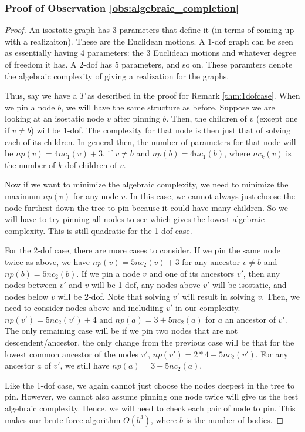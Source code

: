\subsubsection{Proof of Observation \ref{obs:algebraic_completion}}
\begin{proof}
    An isostatic graph has 3 parameters that define it (in terms of coming up with a realizaiton). These are the Euclidean motions. A 1-dof graph can be seen as essentially having 4 parameters: the 3 Euclidean motions and whatever degree of freedom it has. A 2-dof has 5 parameters, and so on. These paramters denote the algebraic complexity of giving a realization for the graphs.

    Thus, say we have a $T$ as described in the proof for Remark \ref{thm:1dofcase}. When we pin a node $b$, we will have the same structure as before. Suppose we are looking at an isostatic node $v$ after pinning $b$. Then, the children of $v$ (except one if $v \neq b$) will be 1-dof. The complexity for that node is then just that of solving each of its children. In general then, the number of parameters for that node will be $np(v) = 4nc_1(v)+3$, if $v \neq b$ and $np(b) = 4nc_1(b)$, where $nc_k(v)$ is the number of $k$-dof children of $v$.

    Now if we want to minimize the algebraic complexity, we need to minimize the maximum $np(v)$ for any node $v$. In this case, we cannot always just choose the node furthest down the tree to pin because it could have many children. So we will have to try pinning all nodes to see which gives the lowest algebraic complexity. This is still quadratic for the 1-dof case.

    For the 2-dof case, there are more cases to consider. If we pin the same node twice as above, we have $np(v) = 5nc_2(v)+3$ for any ancestor $v \neq b$ and $np(b) = 5nc_2(b)$. If we pin a node $v$ and one of its ancestors $v'$, then any nodes between $v'$ and $v$ will be 1-dof, any nodes above $v'$ will be isostatic, and nodes below $v$ will be 2-dof. Note that solving $v'$ will result in solving $v$. Then, we need to consider nodes above and includiing $v'$ in our complexity. $np(v') = 5nc_2(v') + 4$ and $np(a) = 3 + 5nc_2(a)$ for $a$ an ancestor of $v'$. The only remaining case will be if we pin two nodes that are not descendent/ancestor. the only change from the previous case will be that for the lowest common ancestor of the nodes $v'$, $np(v') = 2*4+5nc_2(v')$. For any ancestor $a$ of $v'$, we still have $np(a) = 3 + 5nc_2(a)$.

    Like the 1-dof case, we again cannot just choose the nodes deepest in the tree to pin. However, we cannot also assume pinning one node twice will give us the best algebraic complexity. Hence, we will need to check each pair of node to pin. This makes our brute-force algorithm $O(b^3)$, where $b$ is the number of bodies.
\end{proof}




